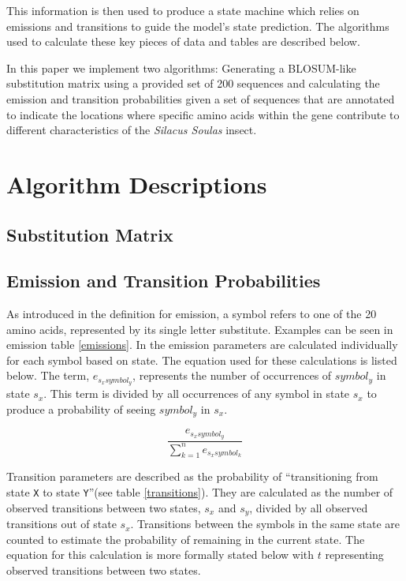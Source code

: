 \documentclass[a4paper,11pt]{article}
\begin{document}
This information is then used to produce a state machine which relies on emissions and transitions to guide the model's state prediction. The algorithms used to calculate these key pieces of data and tables are described below.

In this paper we implement two algorithms: Generating a BLOSUM-like substitution matrix using a provided set of 200 sequences and calculating the emission and transition probabilities given a set of sequences that are annotated to indicate the locations where specific amino acids within the gene contribute to different characteristics of the \textit{Silacus Soulas} insect.


\section{Algorithm Descriptions}

\subsection{Substitution Matrix}





\subsection{Emission and Transition Probabilities}

As introduced in the definition for emission, a symbol refers to one of the 20 amino acids, represented by its single letter substitute. Examples can be seen in emission table \ref{emissions}. In the emission parameters are calculated individually for each symbol based on state. The equation used for these calculations is listed below. The term, $e_{s_{x}symbol_y}$, represents the number of occurrences of $symbol_y$ in state $s_x$. This term is divided by all occurrences of any symbol in state $s_x$ to produce a probability of seeing $symbol_y$ in $s_x$.

\begin{equation}
    \frac{e_{s_{x}symbol_y}}{\sum_{k=1}^n e_{s_xsymbol_k}}
\end{equation}


Transition parameters are described as the probability of ``transitioning from state \verb+X+ to state \verb+Y+''(see table \ref{transitions}). They are calculated as the number of observed transitions between two states, $s_x$ and $s_y$, divided by all observed transitions out of state $s_x$. Transitions between the symbols in the same state are counted to estimate the probability of remaining in the current state. The equation for this calculation is more formally stated below with $t$ representing observed transitions between two states.
\end{document}
